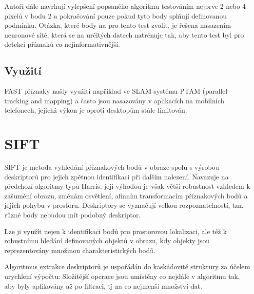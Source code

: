 		Autoři dále navrhují vylepšení popsaného algoritmu testováním nejprve 2 nebo 4 pixelů v bodu 2 a pokračování pouze pokud tyto body splňují definovanou podmínku. Otázka, které body na pro tento test zvolit, je řešena nasazením neuronové sítě, která se na určitých datech natrénuje tak, aby tento test byl pro detekci příznaků co nejinformativnější.
		
	\subsection{Využití}
	
		FAST příznaky našly využití například ve SLAM systému PTAM (parallel tracking and mapping) a často jsou nasazovány v aplikacích na mobilních telefonech, jejichž výkon je oproti desktopům stále limitován.	
	 

\section{SIFT}
\label{sec:sift}
	SIFT \cite{lowe2004distinctive} je metoda vyhledání příznakových bodů v obraze spolu s výrobou deskriptorů pro jejich zpětnou identifikaci při dalším nalezení. Navazuje na předchozí algoritmy typu Harris, její výhodou je však větší robustnost vzhledem k zašumění obrazu, změnám osvětlení, afinním transformacím příznakových bodů a jejich pohybu v prostoru. Deskriptory se vyznačují velkou rozpoznatelností, tzn. různé body nebudou mít podobný deskriptor.
	
	Lze ji využít nejen k identifikaci bodů pro prostorovou lokalizaci, ale též k robustnímu hledání definovaných objektů v obrazu, kdy objekty jsou reprezentovány množinou charakteristických bodů.
	
	Algoritmus extrakce deskriptorů je uspořádán do kaskádovité struktury  za účelem urychlení výpočtu: Složitější operace jsou umístěny co  nejdále v algoritmu tak, aby byly aplikovány až po filtraci, tj na co nejmenší množství dat.
	
